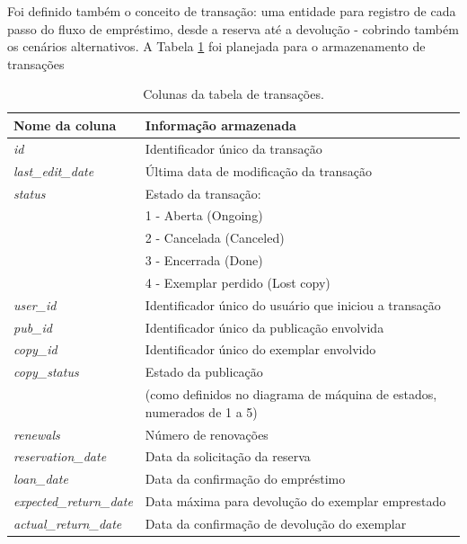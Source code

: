 \documentclass[a4paper]{article}
\begin{document}
Foi definido também o conceito de transação: uma entidade para registro de cada passo do fluxo de empréstimo, desde a reserva até a devolução - cobrindo também os cenários alternativos. A Tabela \ref{transactions-table} foi planejada para o armazenamento de transações


\begin{table}[hc]
\centering
\caption{Colunas da tabela de transações.\label{transactions-table}}
\begin{tabular}{ll}
\hline
Nome da coluna & Informação armazenada \\
\hline
\textit{id}                        & {Identificador único da transação} \\
\hline
\textit{last\_edit\_date}        & {Última data de modificação da transação} \\
\hline
\textit{status}                    & Estado da transação:\\
&                                1 - Aberta (Ongoing)\\
&                                2 - Cancelada (Canceled)\\
&                                3 - Encerrada (Done)\\
&                                4 - Exemplar perdido (Lost copy) \\
\hline
\textit{user\_id}                & {Identificador único do usuário que iniciou a transação} \\
\hline
\textit{pub\_id}                & {Identificador único da publicação envolvida} \\
\hline
\textit{copy\_id}                & {Identificador único do exemplar envolvido} \\
\hline
\textit{copy\_status}            & Estado da publicação\\
&                                (como definidos no diagrama de máquina de estados, numerados de 1 a 5) \\
\hline
\textit{renewals}                & {Número de renovações} \\
\hline
\textit{reservation\_date}        & {Data da solicitação da reserva} \\
\hline
\textit{loan\_date}                & {Data da confirmação do empréstimo} \\
\hline
\textit{expected\_return\_date}    & {Data máxima para devolução do exemplar emprestado} \\
\hline
\textit{actual\_return\_date}        & {Data da confirmação de devolução do exemplar} \\
\hline
\end{tabular}
\end{table}
\end{document}
